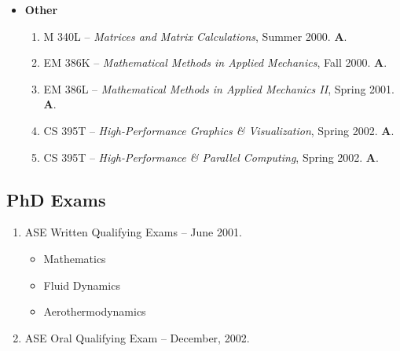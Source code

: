 \documentclass[11pt]{article}
\begin{document}
\begin{itemize}
  \item \textbf{Other}
    \begin{enumerate}
    \item M 340L -- \emph{Matrices and Matrix Calculations}, Summer 2000. \textbf{A}.
    \item EM 386K -- \emph{Mathematical Methods in Applied Mechanics}, Fall 2000. \textbf{A}.
    \item EM 386L -- \emph{Mathematical Methods in Applied Mechanics II}, Spring 2001. \textbf{A}.
    \item CS 395T -- \emph{High-Performance Graphics \& Visualization}, Spring 2002. \textbf{A}.
    \item CS 395T -- \emph{High-Performance \& Parallel Computing}, Spring 2002. \textbf{A}.    
    \end{enumerate}
\end{itemize}


\subsection*{PhD Exams}
\begin{enumerate}
\item ASE Written Qualifying Exams -- June 2001.
  \begin{itemize}
  \item Mathematics
  \item Fluid Dynamics
  \item Aerothermodynamics
  \end{itemize}
\item ASE Oral Qualifying Exam -- December, 2002.
\end{enumerate}
    
\end{document}
